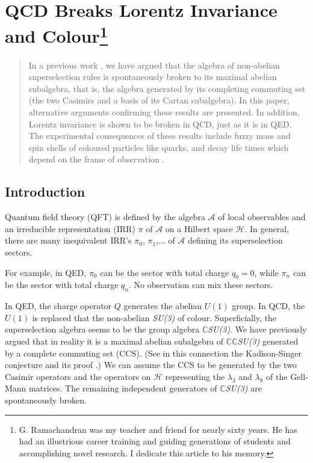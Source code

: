 \chapter[QCD Breaks Lorentz Invariance and Colour]{QCD Breaks Lorentz Invariance and Colour\footnote[*]{G. Ramachandran was my teacher and friend for nearly sixty years. He has had an illustrious career training and guiding generations of students and accomplishing novel research. I dedicate this article to his memory.}}\label{chap4}



\begin{abstract}
In a previous work \cite{chap4-key1}, we have argued that the algebra of non-abelian superselection rules is spontaneously broken to its maximal abelian subalgebra, that is, the algebra generated by its completing commuting set (the two Casimirs and a basis of its Cartan subalgebra). In this paper, alternative arguments confirming these results are presented. In addition, Lorentz invariance is shown to be broken in QCD, just as it is in QED. The experimental consequences of these results include fuzzy mass and spin shells of coloured particles like quarks, and decay life times which depend on the frame of observation \cite{chap4-key2,chap4-key3,chap4-key4}.
\end{abstract}

\section{Introduction}\label{chap4-sec1}

Quantum field theory (QFT) is defined by the algebra $\mathcal{A}$ of local observables and an irreducible representation (IRR) $\pi$ of $\mathcal{A}$ on a Hilbert space $\mathcal{H}$. In general, there are many inequivalent IRR's $\pi_{0}$, $\pi_{1}$,... of $\mathcal{A}$ defining its superselection sectors.

For example, in QED, $\pi_{0}$ can be the sector with total charge $q_{0}= 0$, while $\pi_{n}$ can be the sector with total charge $q_{n}$. No observation can mix these sectors.

In QED, the charge operator $Q$ generates the abelian $U(1)$ group. In QCD, the $U(1)$ is replaced that the non-abelian \textit{SU(3)} of colour. Superficially, the superselection algebra seems to be the group algebra $\mathbb{C}$\textit{SU(3)}. We have previously argued \cite{chap4-key1} that in reality it is a maximal abelian subalgebra of $\mathbb{CC}$\textit{SU(3)} generated by a complete commuting set (CCS). (See in this connection the Kadison-Singer conjecture and its proof \cite{chap4-key5}.) We can assume the CCS to be generated by the two Casimir operators and the operators on $\mathcal{H}$ representing the $\lambda_{3}$ and $\lambda_{8}$ of the Gell-Mann matrices. The remaining independent generators of $\mathbb{C}$\textit{SU(3)} are spontaneously broken.

